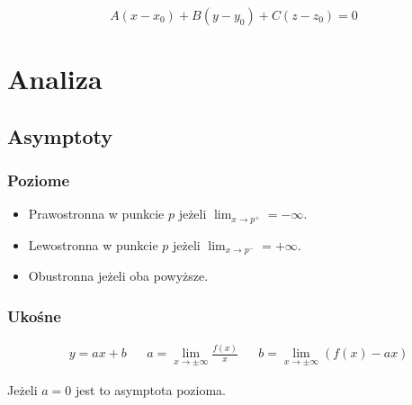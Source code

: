 \documentclass[11pt]{article}
\begin{document}
$$A(x - x_{0}) + B(y-y_{0}) + C(z - z_{0}) = 0$$
\section{Analiza}
\label{sec:orge3e7acb}
\subsection{Asymptoty}
\label{sec:org4258be9}
\subsubsection{Poziome}
\label{sec:org23fef1b}
\begin{itemize}
\item Prawostronna w punkcie \(p\)
jeżeli \(\lim_{x \to p^+} = - \infty\).
\item Lewostronna w punkcie \(p\)
jeżeli \(\lim_{x \to p^-} = + \infty\).
\item Obustronna  jeżeli oba powyższe.
\end{itemize}
\subsubsection{Ukośne}
\label{sec:org74cc247}
\begin{latex}
\begin{align*}
  & y = ax +b
  && a = \lim_{x \to \pm \infty} \frac{f(x)}{x}
  && b = \lim_{x \to \pm \infty } \left( f(x) -ax \right)
\end{align*}
\end{latex}
Jeżeli \(a = 0\) jest to asymptota pozioma.
\end{document}
